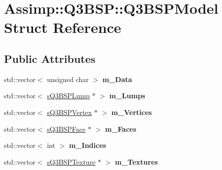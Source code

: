 \hypertarget{struct_assimp_1_1_q3_b_s_p_1_1_q3_b_s_p_model}{\section{Assimp\+:\+:Q3\+B\+S\+P\+:\+:Q3\+B\+S\+P\+Model Struct Reference}
\label{struct_assimp_1_1_q3_b_s_p_1_1_q3_b_s_p_model}
}
\subsection*{Public Attributes}
\begin{DoxyCompactItemize}
\item 
\hypertarget{struct_assimp_1_1_q3_b_s_p_1_1_q3_b_s_p_model_a2d36f20ad45561c445cff1cd0fb21906}{std\+::vector$<$ unsigned char $>$ {\bfseries m\+\_\+\+Data}}\label{struct_assimp_1_1_q3_b_s_p_1_1_q3_b_s_p_model_a2d36f20ad45561c445cff1cd0fb21906}

\item 
\hypertarget{struct_assimp_1_1_q3_b_s_p_1_1_q3_b_s_p_model_a8caffbda6f398712538379ca018a45be}{std\+::vector$<$ \hyperlink{struct_assimp_1_1_q3_b_s_p_1_1s_q3_b_s_p_lump}{s\+Q3\+B\+S\+P\+Lump} $\ast$ $>$ {\bfseries m\+\_\+\+Lumps}}\label{struct_assimp_1_1_q3_b_s_p_1_1_q3_b_s_p_model_a8caffbda6f398712538379ca018a45be}

\item 
\hypertarget{struct_assimp_1_1_q3_b_s_p_1_1_q3_b_s_p_model_ac46e28d21e0aefcda4f3e49095bce4ff}{std\+::vector$<$ \hyperlink{struct_assimp_1_1_q3_b_s_p_1_1s_q3_b_s_p_vertex}{s\+Q3\+B\+S\+P\+Vertex} $\ast$ $>$ {\bfseries m\+\_\+\+Vertices}}\label{struct_assimp_1_1_q3_b_s_p_1_1_q3_b_s_p_model_ac46e28d21e0aefcda4f3e49095bce4ff}

\item 
\hypertarget{struct_assimp_1_1_q3_b_s_p_1_1_q3_b_s_p_model_a9edfb280efc358d38d67c70195b75820}{std\+::vector$<$ \hyperlink{struct_assimp_1_1_q3_b_s_p_1_1s_q3_b_s_p_face}{s\+Q3\+B\+S\+P\+Face} $\ast$ $>$ {\bfseries m\+\_\+\+Faces}}\label{struct_assimp_1_1_q3_b_s_p_1_1_q3_b_s_p_model_a9edfb280efc358d38d67c70195b75820}

\item 
\hypertarget{struct_assimp_1_1_q3_b_s_p_1_1_q3_b_s_p_model_a345ab45445e069c943267c287a24f01e}{std\+::vector$<$ int $>$ {\bfseries m\+\_\+\+Indices}}\label{struct_assimp_1_1_q3_b_s_p_1_1_q3_b_s_p_model_a345ab45445e069c943267c287a24f01e}

\item 
\hypertarget{struct_assimp_1_1_q3_b_s_p_1_1_q3_b_s_p_model_ad214f1eb45cfe03de860e0d55a5e8e4e}{std\+::vector$<$ \hyperlink{struct_assimp_1_1_q3_b_s_p_1_1s_q3_b_s_p_texture}{s\+Q3\+B\+S\+P\+Texture} $\ast$ $>$ {\bfseries m\+\_\+\+Textures}}\label{struct_assimp_1_1_q3_b_s_p_1_1_q3_b_s_p_model_ad214f1eb45cfe03de860e0d55a5e8e4e}


\end{DoxyCompactItemize}
